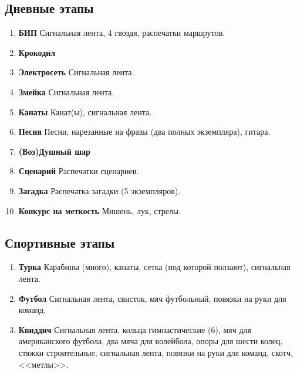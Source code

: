 
\subsection*{Дневные этапы}
	\begin{enumerate}
	\item \textbf{БИП} Сигнальная лента, 4 гвоздя, распечатки маршрутов.
	\item \textbf{Крокодил}
	\item \textbf{Электросеть} Сигнальная лента.
	\item \textbf{Змейка} Сигнальная лента.
	\item \textbf{Канаты} Канат(ы), сигнальная лента.
	\item \textbf{Песня} Песни, нарезанные на фразы (два полных экземпляра), гитара.
	\item \textbf{(Воз)Душный шар}
	\item \textbf{Сценарий} Распечатки сценариев.
	\item \textbf{Загадка} Распечатка загадки (5 экземпляров).
	\item \textbf{Конкурс на меткость} Мишень, лук, стрелы.
	\end{enumerate}
	
\subsection*{Спортивные этапы}
	\begin{enumerate}
	\item \textbf{Турка} Карабины (много), канаты, сетка (под которой ползают), сигнальная лента.
	\item \textbf{Футбол} Сигнальная лента, свисток, мяч футбольный, повязки на руки для команд.
	\item \textbf{Квиддич} Сигнальная лента, кольца гимнастические (6), мяч для американского футбола, два мяча для волейбола, опоры для шести колец, стяжки строительные, сигнальная лента, повязки на руки для команд, скотч, <<метлы>>.
	\end{enumerate}
	
